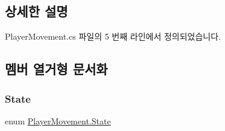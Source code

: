 \subsection{상세한 설명}


Player\+Movement.\+cs 파일의 5 번째 라인에서 정의되었습니다.



\subsection{멤버 열거형 문서화}
\mbox{\label{class_player_movement_a0dc6677272370f08106ac49997853c6f}} 
\subsubsection{\texorpdfstring{State}{State}}
{\footnotesize\ttfamily enum \mbox{\hyperlink{class_player_movement_a0dc6677272370f08106ac49997853c6f}{Player\+Movement.\+State}}\hspace{0.3cm}{\ttfamily [strong]}}

